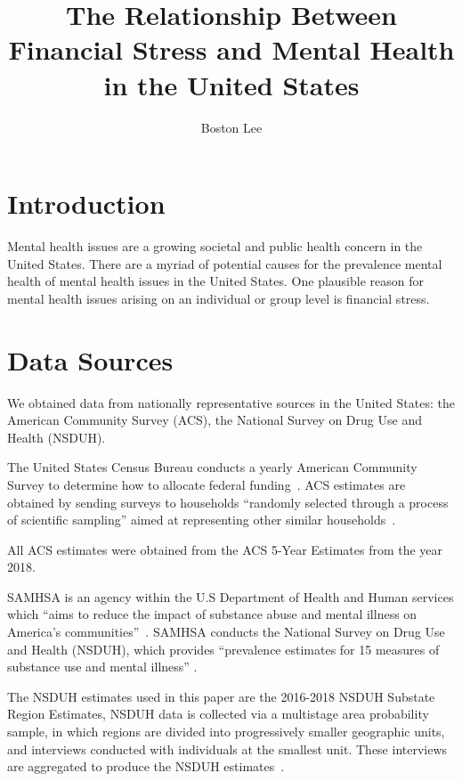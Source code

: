 \documentclass{article}
\title{The Relationship Between Financial Stress and Mental Health in the United States}
\author{Boston Lee}
\begin{document}
\maketitle

\pagebreak

\tableofcontents

\pagebreak

\section{Introduction}

Mental health issues are a growing societal and public health concern
in the United States.
There are a myriad of potential causes for the prevalence mental health
of mental health issues in the United States.
One plausible reason for mental health issues arising
on an individual or group level
is financial stress.

\section{Data Sources}

We obtained data from nationally representative sources
in the United States:
the American Community Survey (ACS),
the National Survey on Drug Use and Health (NSDUH).

The United States Census Bureau
conducts a yearly American Community Survey
to determine how to allocate federal
funding~\cite{acs_description}.
ACS estimates are obtained by
sending surveys to households
``randomly selected through a process of scientific sampling''
aimed at representing other similar households~\cite{acs_sampling}.


All ACS estimates were obtained from
the ACS 5-Year Estimates from the year 2018.

SAMHSA is an agency within
the U.S Department of Health and Human services which
``aims to reduce the impact of substance abuse and mental
illness on America's communities''~\cite{samhsa_about_us}.
SAMHSA conducts
the National Survey on Drug Use and Health (NSDUH),
which provides
``prevalence estimates for 15 measures of substance use and mental illness''
\cite{samhsa_data}.

The NSDUH estimates used in this paper are the
2016-2018 NSDUH Substate Region Estimates,
NSDUH data is collected via a multistage area probability sample,
in which regions are divided
into progressively smaller geographic units,
and interviews conducted with individuals at the smallest unit.
These interviews are aggregated to produce the NSDUH
estimates~\cite{nsduh_description}.
\end{document}
